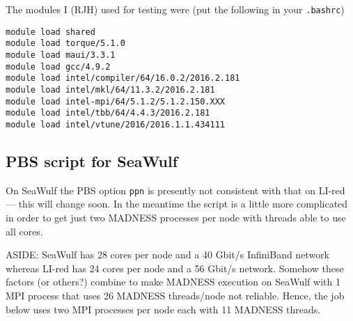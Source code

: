 \documentclass[letterpaper]{book}
\begin{document}
The modules I (RJH) used for testing were (put the following in your \verb+.bashrc+)
\begin{verbatim}
module load shared                                                              
module load torque/5.1.0                                                        
module load maui/3.3.1                                                          
module load gcc/4.9.2                                                           
module load intel/compiler/64/16.0.2/2016.2.181                                 
module load intel/mkl/64/11.3.2/2016.2.181
module load intel-mpi/64/5.1.2/5.1.2.150.XXX
module load intel/tbb/64/4.4.3/2016.2.181
module load intel/vtune/2016/2016.1.1.434111
\end{verbatim}

\subsection{PBS script for SeaWulf}

On SeaWulf the PBS option {\tt ppn} is presently not consistent with
that on LI-red --- this will change soon.  In the meantime the script
is a little more complicated in order to get just two MADNESS
processes per node with threads able to use all cores.

ASIDE: SeaWulf has 28 cores per node and a 40 Gbit/s InfiniBand
network whereas LI-red has 24 cores per node and a 56 Gbit/s network.
Somehow these factors (or others?) combine to make MADNESS execution
on SeaWulf with 1 MPI process that uses 26 MADNESS threads/node not
reliable.  Hence, the job below uses two MPI processes per node each
with 11 MADNESS threads.
\end{document}
